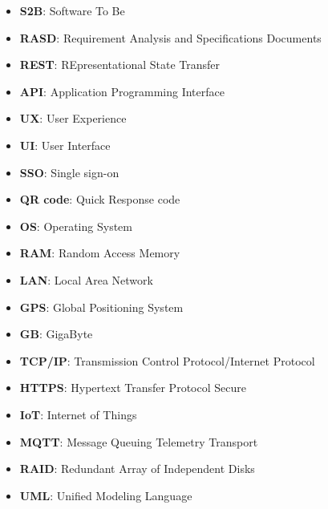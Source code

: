 \begin{itemize}
      \item \textbf{S2B}: Software To Be
      \item \textbf{RASD}: Requirement Analysis and Specifications Documents
      \item \textbf{REST}: REpresentational State Transfer
      \item \textbf{API}: Application Programming Interface
      \item \textbf{UX}: User Experience
      \item \textbf{UI}: User Interface
      \item \textbf{SSO}: Single sign-on
      \item \textbf{QR code}: Quick Response code
      \item \textbf{OS}: Operating System
      \item \textbf{RAM}: Random Access Memory
      \item \textbf{LAN}: Local Area Network
      \item \textbf{GPS}: Global Positioning System
      \item \textbf{GB}: GigaByte
      \item \textbf{TCP/IP}: Transmission Control Protocol/Internet Protocol
      \item \textbf{HTTPS}: Hypertext Transfer Protocol Secure
      \item \textbf{IoT}: Internet of Things
      \item \textbf{MQTT}: Message Queuing Telemetry Transport
      \item \textbf{RAID}: Redundant Array of Independent Disks
      \item \textbf{UML}: Unified Modeling Language


\end{itemize}

\vfill
\pagebreak

